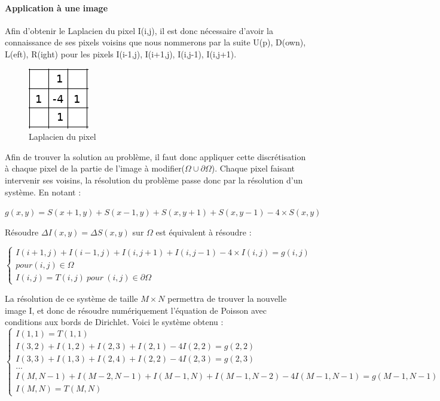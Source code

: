 \paragraph{Application à une image }
Afin d'obtenir le Laplacien du pixel I(i,j), il est donc nécessaire d'avoir la connaissance de ses pixels voisins que nous nommerons par la suite U(p), D(own), L(eft), R(ight) pour les pixels I(i-1,j), I(i+1,j), I(i,j-1), I(i,j+1). 

\begin{figure}[!h]
\centering
    \includegraphics[scale = 0.8]{Images/Laplacian.png}
    \caption{Laplacien du pixel}
\end{figure}
Afin de trouver la solution au problème, il faut donc appliquer cette discrétisation à chaque pixel de la partie de l'image à modifier($\Omega \cup \partial \Omega$). Chaque pixel faisant intervenir ses voisins, la résolution du problème passe donc par la résolution d'un système.
En notant :
\begin{center}
 $g(x,y) = S(x+1,y) + S(x-1,y)+ S(x,y+1) + S(x,y-1) - 4\times S(x,y)$\\
 \end{center}
Résoudre $\Delta I(x,y) = \Delta S(x,y)$ sur $\Omega$ est équivalent à résoudre :\\
\begin{center}
\begin{equation*}
    \left \{
    \begin{aligned}
    I(i+1,j) + I(i-1,j)+ I(i,j+1) + I(i, j-1) - 4\times 			I(i,j)= g(i,j)\\ pour (i,j)\in \Omega \\
    I(i,j) = T(i,j) \ pour \ (i,j) \in \partial \Omega
    \end{aligned}
    \right.
\end{equation*}
\end{center}
La résolution de ce système de taille $M\times N $ permettra de trouver la nouvelle image I, et donc de résoudre numériquement l'équation de Poisson avec conditions aux bords de Dirichlet. Voici le système obtenu : 
\begin{equation}
\left\{
\begin{aligned}
I(1,1) = T(1,1)\\
I(3,2)+I(1,2)+ I(2,3)+I(2,1)-4I(2,2) =g(2,2) \\
I(3,3)+I(1,3)+ I(2,4)+I(2,2)-4I(2,3) =g(2,3)             \\
... \\
I(M,N-1)+I(M-2,N-1)+ I(M-1,N)+I(M-1,N-2)-4I(M-1,N-1) =g(M-1,N-1)\\
I(M, N) = T(M, N)
\end{aligned}
\right.
\end{equation}
